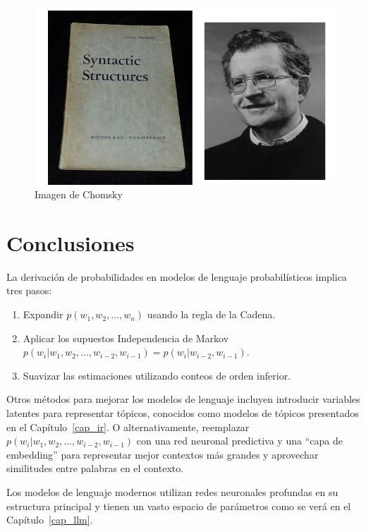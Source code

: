 \begin{figure}[h]
    \centering
    \includegraphics[scale = 0.4]{pics/chomsky.png}
    \caption{Imagen de Chomsky}
    \label{fig:chomsky}
\end{figure}


\section{Conclusiones}
La derivación de probabilidades en modelos de lenguaje probabilísticos implica tres pasos:
    \begin{enumerate}
        \item Expandir $p(w_1, w_2, \ldots, w_n)$ usando la regla de la Cadena.
        \item Aplicar los supuestos Independencia de Markov \\
        $p(w_i | w_1, w_2, \ldots, w_{i-2}, w_{i-1}) = p(w_i | w_{i-2}, w_{i-1})$.
        \item Suavizar las estimaciones utilizando conteos de orden inferior.
    \end{enumerate}
Otros métodos para mejorar los modelos de lenguaje incluyen introducir variables latentes para representar tópicos, conocidos como modelos de tópicos \cite{blei2003latent} presentados en el Capítulo~\ref{cap_ir}. O alternativamente, reemplazar $p(w_i | w_1, w_2, \ldots, w_{i-2}, w_{i-1})$ con una red neuronal predictiva y una ``capa de embedding'' para representar mejor contextos más grandes y aprovechar similitudes entre palabras en el contexto. \cite{bengio2000neural}

Los modelos de lenguaje modernos utilizan redes neuronales profundas en su estructura principal y tienen un vasto espacio de parámetros como se verá en el Capítulo~\ref{cap_llm}.

